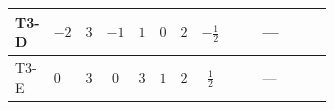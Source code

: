 \documentclass[8pt]{article}
\begin{document}
\begin{landscape}
\begin{longtable}{@{}llcccccc >{\raggedright\arraybackslash}p{0.21\linewidth} >{\raggedright\arraybackslash}p{0.21\linewidth} >{\raggedright\arraybackslash}p{0.21\linewidth}@{}}
\midrule
T3-D & $-2$ & $3$ & $-1$ & $1$ & $0$ & $2$ & $-\frac{1}{2}$ & \scriptsize\adjustbox{max width=\linewidth}{$\begin{gathered} +8 {\lambda_{H1}} {\lambda_{S_1}}\end{gathered}$} & --- & \scriptsize\adjustbox{max width=\linewidth}{$\begin{gathered} -\frac{33 {g_2}^2 {\lambda_{H1}}}{2}\end{gathered}$} \\
\midrule
T3-E & $0$ & $3$ & $0$ & $3$ & $1$ & $2$ & $\frac{1}{2}$ & \scriptsize\adjustbox{max width=\linewidth}{$\begin{gathered} +8 {\lambda_{H1}} {\lambda_{S_1}}\end{gathered}$} & --- & \scriptsize\adjustbox{max width=\linewidth}{$\begin{gathered} -\frac{33 {g_2}^2 {\lambda_{H1}}}{2}\end{gathered}$} \\
\midrule
\bottomrule
\end{longtable}
\clearpage

\end{landscape}
\end{document}
